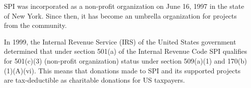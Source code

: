 \documentclass[a4paper]{report}
\begin{document}
SPI was incorporated as a non-profit organization on June 16, 1997 in the state of New York. Since then, it has become an umbrella organization for projects from the community.

In 1999, the Internal Revenue Service (IRS) of the United States government determined that under section 501(a) of the Internal Revenue Code SPI qualifies for 501(c)(3) (non-profit organization) status under section 509(a)(1) and 170(b)(1)(A)(vi). This means that donations made to SPI and its supported projects are tax-deductible as charitable donations for US taxpayers.

\newpage

\pagestyle{empty}


\null
\end{document}
